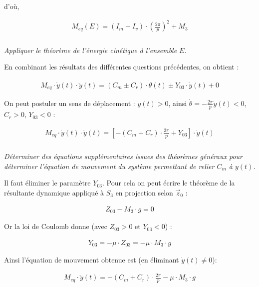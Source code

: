 \documentclass[10pt,fleqn]{article} %
\begin{document}
\begin{multicols}{2}
\begin{corrige}
d'où,

\begin{align*}
M_{eq}(E)=\left(I_m+I_v\right)\cdot \left(\frac{2\pi}{p}\right)^2+ M_3
\end{align*}
\end{corrige}\else\fi


\subparagraph{}\textit{Appliquer le théorème de l'énergie cinétique à l'ensemble $E$.}

\ifprof\begin{corrige}
En combinant les résultats des différentes questions précédentes, on obtient : 

\begin{align*}
M_{eq}\cdot \dot{y}(t)\cdot \ddot{y}(t)=\left(C_m\pm C_r\right)\cdot \dot{\theta}(t)\pm Y_{03}\cdot \dot{y}(t)+0
\end{align*}

On peut postuler un sens de déplacement : $\dot{y}(t)>0$, ainsi $\dot{\theta}=-\frac{2\pi}{p}\dot{y}(t)<0$,  $C_r>0$, $Y_{03}<0$ : 

\begin{align*}
M_{eq}\cdot \dot{y}(t)\cdot \ddot{y}(t)=\left[-\left(C_m+ C_r\right)\cdot \frac{2\pi}{p}+ Y_{03}\right]\cdot \dot{y}(t)
\end{align*}
\end{corrige}\else\fi



\subparagraph{}\textit{Déterminer des équations supplémentaires issues des théorèmes généraux pour déterminer l'équation de mouvement du système permettant de relier $C_m$ à $y(t)$.}

\ifprof\begin{corrige}
Il faut éliminer le paramètre $Y_{03}$. Pour cela on peut écrire le théorème de la résultante dynamique appliqué à $S_3$ en projection selon $\overrightarrow{z}_0$ : 

\begin{align*}
Z_{03}-M_3\cdot g=0
\end{align*}

Or la loi de Coulomb donne (avec $Z_{03}>0$ et $Y_{03}<0$) : 

\begin{align*}
Y_{03}=-\mu\cdot Z_{03}=-\mu\cdot M_3\cdot g
\end{align*}

Ainsi l'équation de mouvement obtenue est (en éliminant $\dot{y}(t)\neq 0$): 

\begin{align*}
\boxed{
M_{eq}\cdot \ddot{y}(t)=-\left(C_m+ C_r\right)\cdot \frac{2\pi}{p}- \mu\cdot M_3\cdot g
}
\end{align*}
\end{corrige}\else\fi


\end{multicols}
\end{document}

